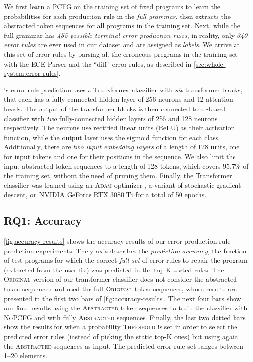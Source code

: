 We first learn a PCFG on the training set of fixed programs to learn the
probabilities for each production rule in the \emph{full \python grammar}.
\toolname then extracts the abstracted token sequences for all programs in the
training set. Next, while the full \python grammar has \emph{455 possible
terminal error production rules}, in reality, only \emph{340 error rules} are
ever used in our dataset and are assigned as \emph{labels}. We arrive at this
set of error rules by parsing all the erroneous programs in the training set
with the ECE-Parser and the ``diff'' error rules, as described in
\autoref{sec:whole-system:error-rules}.

\toolname's error rule prediction uses a Transformer classifier with \emph{six}
transformer blocks, that each has a fully-connected hidden layer of 256 neurons
and 12 attention heads. The output of the transformer blocks is then connected
to a \dnn-based classifier with \emph{two} fully-connected hidden layers of 256
and 128 neurons respectively. The neurons use rectified linear units (ReLU) as
their activation function, while the output layer uses the sigmoid function for
each class. Additionally, there are \emph{two input embedding layers} of a
length of 128 units, one for input tokens and one for their positions in the
sequence. We also limit the input abstracted token sequences to a length of 128
tokens, which covers $95.7\%$ of the training set, without the need of pruning
them. Finally, the Transformer classifier was trained using an \textsc{Adam}
optimizer \citep{Kingma2014-ng}, a variant of stochastic gradient descent, on
NVIDIA GeForce RTX 3080 Ti for a total of 50 epochs.

\subsection{RQ1: Accuracy}
\label{sec:eval:accuracy}



\autoref{fig:accuracy-results} shows the accuracy results of our error
production rule prediction experiments. The y-axis describes the
\emph{prediction accuracy}, \ie the fraction of test programs for which the
correct \emph{full set} of error rules to repair the program (extracted from
the user fix) was predicted in the top-K sorted rules.
%
The \textsc{Original} version of our transformer classifier does not consider
the abstracted token sequences and used the full \textsc{Original} token
sequences, whose results are presented in the first two bars of
\autoref{fig:accuracy-results}. The next four bars show our final results using
the \textsc{Abstracted} token sequences to train the classifier with
\textsc{NoPCFG} and with fully \textsc{Abstracted} sequences. Finally, the last
two dotted bars show the results for when a probability \textsc{Threshold} is
set in order to select the predicted error rules (instead of picking the static
top-K ones) but using again the \textsc{Abstracted} sequences as input. The
predicted error rule set ranges between 1--20 elements.

